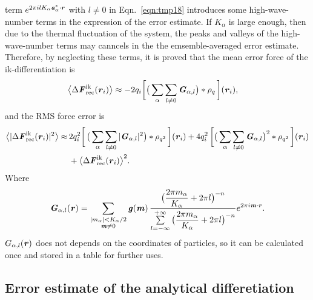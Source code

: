 \documentclass[aps,pre,preprint]{revtex4}
\renewcommand{\v}[1]{\textbf{\textit{#1}}}
\begin{document}
term $e^{2\pi i l K_\alpha\v a^\ast_\alpha\cdot\v r}$ with $l\neq 0$
in Eqn.~\eqref{eqn:tmp18} introduces some high-wave-number terms in
the expression of the error estimate.  If $K_\alpha$ is large enough,
then due to the thermal fluctuation of the system, the peaks and
valleys of the high-wave-number terms may canncels in the the
emsemble-averaged error estimate.
Therefore, by neglecting these terms, it is proved that the mean error
force of the ik-differentiation is
\begin{align}
  \big\langle
  \Delta\v F_{\textrm{rec}}^{\textrm{ik}}(\v r_i)
  \big\rangle
  & \approx
  - 2 q_i
  \bigg[
  \big(
  \sum_{\alpha}\sum_{l\neq 0}\v G_{\alpha,l}
  \big)
  \ast\rho_q\,
  \bigg] (\v r_i),
\end{align}
and the RMS force error is 
\begin{align}\nonumber
  \big\langle
  \vert\Delta\v F_{\textrm{rec}}^{\textrm{ik}}(\v r_i)\vert^2
  \big\rangle
  \approx&\, 
  2q_i^2
  \bigg[\,
  \big(
  \sum_{\alpha} \sum_{l\neq 0}
  \vert \v G_{\alpha,l}\vert^2
  \big)
  \ast \rho_{q^2}
  \,\bigg] (\v r_i)
  +
  4q_i^2\,
  \bigg[
  \big(
  \sum_{\alpha} \sum_{l\neq 0}  
  \v G_{\alpha,l}
  \big)^2
  \ast \rho_{q^2}\,
  \bigg] (\v r_i) \\
  &\,+
  \big\langle
  \Delta\v F_{\textrm{rec}}^{\textrm{ik}}(\v r_i)
  \big\rangle^2.
\end{align}
Where
\begin{align}
  \v G_{\alpha,l}(\v r) =
  \sum_{
    \begin{subarray}{c}
      \vert m_{\alpha}\vert < K_\alpha/2\\
      \v m\neq 0
    \end{subarray}}
  \v g(\v m)\,
  \frac
  {\big(\dfrac{2\pi m_\alpha}{K_\alpha} + 2\pi l\big)^{-n}}
  {\sum\limits_{l=-\infty}^{+\infty}
    \big(\dfrac{2\pi m_\alpha}{K_\alpha} + 2\pi l\big)^{-n}}
  e^{2\pi i\v m\cdot\v r}.
\end{align}
$G_{\alpha,l}(\v r)$ does not depends on the coordinates of particles,
so it can be calculated once and stored in a table for further uses.



\subsection{Error estimate of the analytical differetiation}
\end{document}
